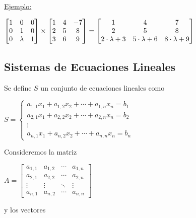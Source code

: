 \documentclass[]{article}
\begin{document}
\underline{Ejemplo:}
\begin{center}
	$\begin{bmatrix}
		1&0&0\\
		0&1&0\\
		0&\lambda&1
	\end{bmatrix}\times
	\begin{bmatrix}
		1&4&-7\\
		2&5&8\\
		3&6&9
	\end{bmatrix} =
	\begin{bmatrix}
		1&4&7\\
		2&5&8\\
		2\cdot\lambda+3 & 5\cdot\lambda + 6 & 8\cdot\lambda +9
	\end{bmatrix}$
\end{center}


\subsection{Sistemas de Ecuaciones Lineales}
Se define $S$ un conjunto de ecuaciones lineales como
\begin{center}
	$S=\begin{cases}
		a_{1,1}x_1+a_{1,2}x_2+\cdots+a_{1,n}x_n=b_1\\
		a_{2,1}x_1+a_{2,2}x_2+\cdots+a_{2,n}x_n=b_2\\
		\vdots\\
		a_{n,1}x_1+a_{n,2}x_2+\cdots+a_{n,n}x_n=b_n
	\end{cases}$
\end{center}

Consideremos la matriz
\begin{center}
	$A=\begin{bmatrix}
		a_{1,1} & a_{1,2} & \cdots & a_{1,n}\\
		a_{2,1} & a_{2,2} & \cdots & a_{2,n}\\
		\vdots & \vdots & \ddots & \vdots \\
		a_{n,1} & a_{n,2} & \cdots & a_{n,n}
	\end{bmatrix}$
\end{center}

y los vectores
\end{document}
